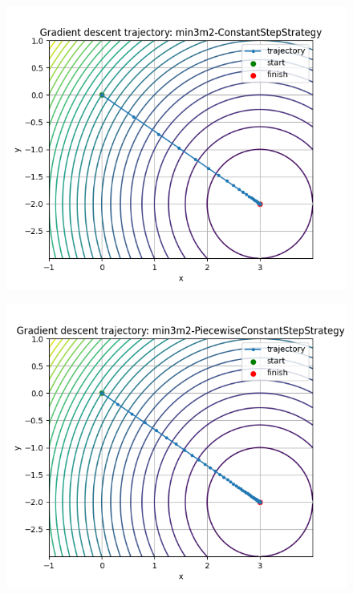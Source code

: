 \documentclass{article}
\begin{document}
\begin{figure}
    \centering
    \includegraphics[width=1\linewidth]{min3m2-ConstantStepStrategy.png}
    \label{fig:enter-label}
\end{figure}
\begin{figure}
    \centering
    \includegraphics[width=1\linewidth]{min3m2-PiecewiseConstantStepStrategy.png}
    \label{fig:enter-label}
\end{figure}
\end{document}
